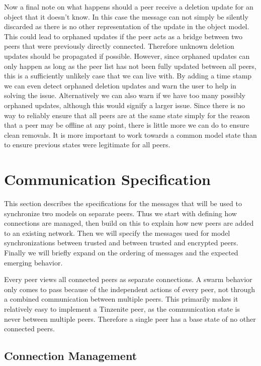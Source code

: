Now a final note on what happens should a peer receive a deletion update for an object that it doesn't know.
In this case the message can not simply be silently discarded as there is no other representation of the update in the object model.
This could lead to orphaned updates if the peer acts as a bridge between two peers that were previously directly connected.
Therefore unknown deletion updates should be propagated if possible.
However, since orphaned updates can only happen as long as the peer list has not been fully updated between all peers, this is a sufficiently unlikely case that we can live with.
By adding a time stamp we can even detect orphaned deletion updates and warn the user to help in solving the issue.
Alternatively we can also warn if we have too many possibly orphaned updates, although this would signify a larger issue.
Since there is no way to reliably ensure that all peers are at the same state simply for the reason that a peer may be offline at any point, there is little more we can do to ensure clean removals.
It is more important to work towards a common model state than to ensure previous states were legitimate for all peers.

\section{Communication Specification}
\label{sec:Communication Specification}

This section describes the specifications for the messages that will be used to synchronize two models on separate peers.
Thus we start with defining how connections are managed, then build on this to explain how new peers are added to an existing network.
Then we will specify the messages used for model synchronizations between trusted and between trusted and encrypted peers.
Finally we will briefly expand on the ordering of messages and the expected emerging behavior.

Every peer views all connected peers as separate connections.
A swarm behavior only comes to pass because of the independent actions of every peer, not through a combined communication between multiple peers.
This primarily makes it relatively easy to implement a Tinzenite peer, as the communication state is never between multiple peers.
Therefore a single peer has a base state of no other connected peers.

\subsection{Connection Management}
\label{sec:conn_management}

